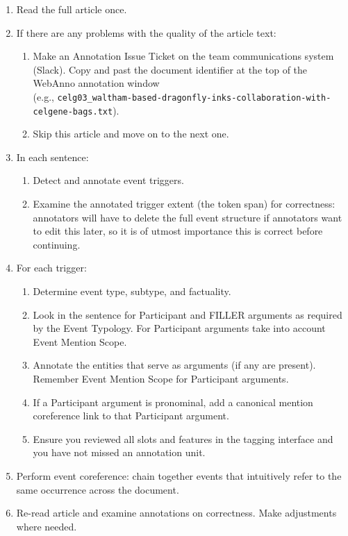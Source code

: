 \bigskip
\begin{enumerate}[leftmargin=*]
    \item Read the full article once.
    \item If there are any problems with the quality of the article text:
        \begin{enumerate}
            \item Make an Annotation Issue Ticket on the team communications system (Slack). Copy and past the document identifier at the top of the WebAnno annotation window\\(e.g., \texttt{celg03\_waltham-based-dragonfly-inks-collaboration-with-celgene-bags.txt}).
            \item Skip this article and move on to the next one.
        \end{enumerate}

    \item In each sentence:
        \begin{enumerate}
            \item Detect and annotate event triggers.
            \item Examine the annotated trigger extent (the token span) for correctness: annotators will have to delete the full event structure if annotators want to edit this later, so it is of utmost importance this is correct before continuing.
        \end{enumerate}
        \item For each trigger:
            \begin{enumerate}
                \item Determine event type, subtype, and factuality.
                \item Look in the sentence for Participant and FILLER arguments as required by the Event Typology. For Participant arguments take into account Event Mention Scope.
                \item Annotate the entities that serve as arguments (if any are present). Remember Event Mention Scope for Participant arguments.
                \item If a Participant argument is pronominal, add a canonical mention coreference link to that Participant argument.
                \item Ensure you reviewed all slots and features in the tagging interface and you have not missed an annotation unit.
            \end{enumerate}
    \item Perform event coreference: chain together events that intuitively refer to the same occurrence across the document.
    \item Re-read article and examine annotations on correctness.
    Make adjustments where needed.
\end{enumerate}

